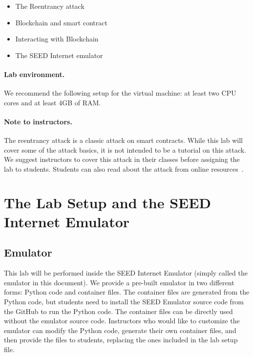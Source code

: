 \begin{itemize}[noitemsep]
    \item The Reentrancy attack
    \item Blockchain and smart contract 
    \item Interacting with Blockchain
    \item The SEED Internet emulator
\end{itemize}

\paragraph{Lab environment.}
\seedenvironmentB
\nodependency
We recommend the following setup for the virtual machine: at least two CPU cores and 
at least 4GB of RAM.


\paragraph{Note to instructors.}
The reentrancy attack is a classic attack on smart contracts. 
While this lab will cover some of the attack basics,
it is not intended to be a tutorial on this attack.
We suggest instructors to cover this attack in their classes before 
assigning the lab to students. 
Students can also read about the attack from online 
resources~\cite{MasteringEthereum}.


\section{The Lab Setup and the SEED Internet Emulator}
\label{sec:labsetup}


\subsection{Emulator} 

This lab will be performed inside the SEED Internet Emulator (simply
called the emulator in this document).
We provide a pre-built emulator in two different forms: Python code
and container files. The container files are generated from
the Python code, but students need to install the SEED Emulator source
code from the GitHub to run the Python code. The container files
can be directly used without the emulator source code.
Instructors who would like to customize the emulator can modify the Python
code, generate their own container files, and then provide the
files to students, replacing the ones included in the
lab setup file.


